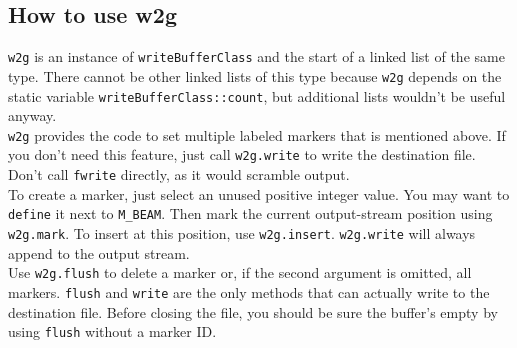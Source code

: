 \documentclass{article}
\begin{document}
\subsection{How to use w2g}
\verb"w2g" is an instance of \verb"writeBufferClass" and the start of a linked list of
the same type. There cannot be other linked lists of this type because \verb"w2g"
depends on the static variable \verb"writeBufferClass::count", but additional lists
wouldn't be useful anyway.\\
\verb"w2g" provides the code to set multiple labeled markers that is mentioned above.
If you don't need this feature, just call \verb"w2g.write" to write the destination
file. Don't call \verb"fwrite" directly, as it would scramble output.\\
To create a marker, just select an unused positive integer value. You may want to
\verb"define" it next to \verb"M_BEAM". Then mark the current output-stream position
using \verb"w2g.mark". To insert at this position, use \verb"w2g.insert".
\verb"w2g.write" will always append to the output stream.\\
Use \verb"w2g.flush" to delete a marker or, if the second argument is omitted, all
markers. \verb"flush" and \verb"write" are the only methods that can actually write
to the destination file. Before closing the file, you should be sure the buffer's
empty by using \verb"flush" without a marker ID.
\end{document}
